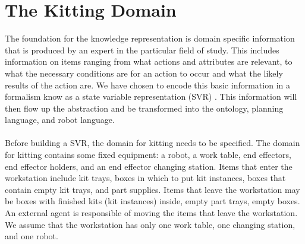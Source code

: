 \section{The Kitting Domain}\label{kitting_domain}

The foundation for the knowledge representation is domain specific information that is produced by an expert in the particular field of study. This includes
information on items ranging from what actions and attributes are relevant, to what the necessary conditions are for an action to occur and what the
likely results of the action are. We have chosen to encode this basic information in a formalism know as a state variable representation (SVR) \cite{NAU.2004}.
This information will then flow up the abstraction and be transformed into the ontology, planning language, and robot language.\\ \\
Before building a SVR, the domain for kitting needs to be specified. The domain for kitting contains some fixed equipment: a robot, a work table, end effectors, end effector holders, and an end effector changing station. Items that enter the workstation include kit trays, boxes in which to put kit instances, boxes that contain empty kit trays, and part supplies. Items that leave the workstation may be boxes with finished kits (kit instances) inside, empty part trays, empty boxes. An external agent is responsible of moving the items that leave the workstation. We assume that the workstation has only one work table, one changing station, and one robot. 